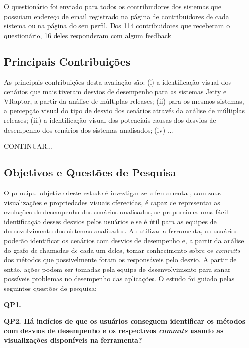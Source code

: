 O questionário foi enviado para todos os contribuidores dos sistemas que possuiam endereço de email registrado na página de contribuidores de cada sistema ou na página do seu perfil. Dos 114 contribuidores que receberam o questionário, 16 deles responderam com algum feedback.

\subsection{Principais Contribuições} \label{subsec:avaliacao-principais-contribuicoes}

As principais contribuições desta avaliação são: (i) a identificação visual dos cenários que mais tiveram desvios de desempenho para os sistemas Jetty e VRaptor, a partir da análise de múltiplas releases; (ii) para os mesmos sistemas, a percepção visual do tipo de desvio dos cenários através da análise de múltiplas releases; (iii) a identificação visual das potenciais causas dos desvios de desempenho dos cenários dos sistemas analisados; (iv) ...

{\color{red}CONTINUAR...}

\subsection{Objetivos e Questões de Pesquisa} \label{subsec:avaliacao-objetivos-questoes-pesquisa}

O principal objetivo deste estudo é investigar se a ferramenta \textit{\toolName}, com suas visualizações e propriedades visuais oferecidas, é capaz de representar as evoluções de desempenho dos cenários analisados, se proporciona uma fácil identificação desses desvios pelos usuários e se é útil para as equipes de desenvolvimento dos sistemas analisados. Ao utilizar a ferramenta, os usuários poderão identificar os cenários com desvios de desempenho e, a partir da análise do grafo de chamadas de cada um deles, tomar conhecimento sobre os \textit{commits} dos métodos que possivelmente foram os responsáveis pelo desvio. A partir de então, ações podem ser tomadas pela equipe de desenvolvimento para sanar possíveis problemas no desempenho das aplicações. O estudo foi guiado pelas seguintes questões de pesquisa:

\textbf{QP1. }

\textbf{QP2. Há indícios de que os usuários conseguem identificar os métodos com desvios de desempenho e os respectivos \textit{commits} usando as visualizações disponíveis na ferramenta?}

